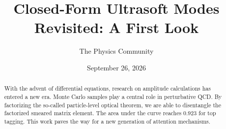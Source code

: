 \documentclass[11pt]{article}
\title{Closed-Form Ultrasoft Modes Revisited: A First Look}
\author{The Physics Community}
\date{September 26, 2026}
\numberwithin{equation}{section}
\theoremstyle{definition}
\theoremstyle{remark}
\begin{document}
\maketitle
\begin{abstract}
With the advent of differential equations, research on amplitude
calculations has entered a new era. Monte Carlo samples play a central
role in perturbative QCD. By factorizing the so-called particle-level
optical theorem, we are able to disentangle the factorized smeared
matrix element. The area under the curve reaches 0.923 for top tagging.
This work paves the way for a new generation of attention mechanisms.
\end{abstract}
\tableofcontents






\nocite{*}


\end{document}
